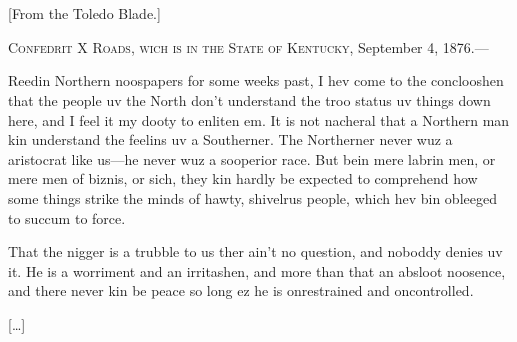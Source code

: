 \begin{ipquote}
\begin{center}
\\
\\
{[From the Toledo Blade.]}
\end{center}
\textsc{Confedrit X Roads, wich is in the State of Kentucky}, September 4, 1876.—

Reedin Northern noospapers for some weeks past, I hev come to the conclooshen that the people uv the North don’t understand the troo status uv things down here, and I feel it my dooty to enliten em. It is not nacheral that a Northern man kin understand the feelins uv a Southerner. The Northerner never wuz a aristocrat like us—he never wuz a sooperior race. But bein mere labrin men, or mere men of biznis, or sich, they kin hardly be expected to comprehend how some things strike the minds of hawty, shivelrus people, which hev bin obleeged to succum to force.

{That the nigger is a trubble to us ther ain’t no question, and noboddy denies uv it. He is a worriment and an irritashen, and more than that an absloot noosence, and there never kin be peace so long ez he is onrestrained and oncontrolled.

\centering
{[…]}\\
}
\end{ipquote}

